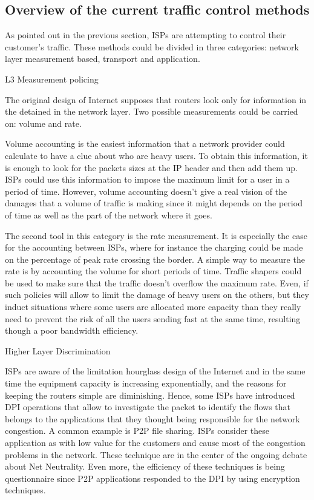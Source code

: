 \subsection{Overview of  the current traffic control methods}
As pointed out in the previous section, ISPs are attempting to control their customer's traffic. These methods could be divided in three categories: network layer measurement based, transport and application.

L3 Measurement policing

The original design of Internet supposes that routers look only for information in the detained in the network layer. Two possible measurements could be carried on: volume and rate.

Volume accounting is the easiest information that a network provider could calculate to have a clue about who are heavy users. To obtain this information, it is enough to look for the packets sizes at the IP header and then add them up. ISPs could use this information to impose the maximum limit for a user in a period of time. However, volume accounting doesn't give a real vision of the damages that a volume of traffic is making since it might depends on the period of time as well as the part of the network where it goes.

The second tool in this category is the rate measurement. It is especially the case for the accounting between ISPs, where for instance the charging could be made on the percentage of peak rate crossing the border. A simple way to measure the rate is by accounting the volume for short periods of  time. Traffic shapers could be used to make sure that the traffic doesn't overflow the maximum rate. Even, if such policies will allow to limit the damage of heavy users on the others, but they induct situations where some users are allocated more capacity than they really need to prevent the risk of all the users sending fast at the same time, resulting though a poor bandwidth efficiency.

Higher Layer Discrimination

ISPs are aware of the limitation hourglass design of the Internet and in the same time the equipment capacity is increasing exponentially, and the reasons for keeping the routers simple are diminishing. Hence, some ISPs have introduced DPI operations that allow to investigate the packet to identify the flows that belongs to the applications that they thought being responsible for the network congestion. A common example is P2P file sharing. ISPs consider these application as with low value for the customers and cause most of the congestion problems in the network. These technique are in the center of the ongoing debate about Net Neutrality. Even more, the efficiency of these techniques is being questionnaire since P2P applications 
responded to the DPI by using encryption techniques.

